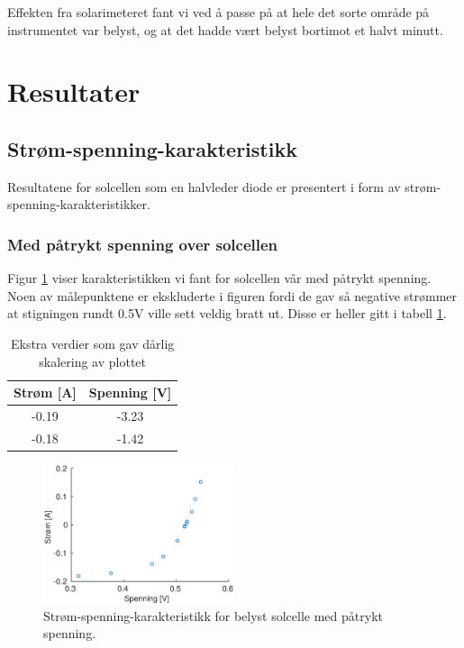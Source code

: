 \documentclass[a4paper,11pt, twocolumn]{article}
\begin{document}
Effekten fra solarimeteret fant vi ved å passe på at hele det sorte område på instrumentet var belyst, og at det hadde vært belyst bortimot et halvt minutt.

\section{Resultater}
\subsection{Strøm-spenning-karakteristikk}
Resultatene for solcellen som en halvleder diode er presentert i form av strøm-spenning-karakteristikker.
\subsubsection{Med påtrykt spenning over solcellen}
Figur \ref{fig:resMedSpenning} viser karakteristikken vi fant for solcellen vår med påtrykt spenning. Noen av målepunktene er ekskluderte i figuren fordi de gav så negative strømmer at stigningen rundt 0.5V ville sett veldig bratt ut. Disse er heller gitt i tabell \ref{tab:ekstra}.

\begin{table}[!ht]
\centering
	\caption{Ekstra verdier som gav dårlig skalering av plottet}
	\label{tab:ekstra}
	\begin{tabular}{cc}
		\toprule
		\toprule
		Strøm [A] & Spenning [V]\\
		\hline
		-0.19 & -3.23\\
		-0.18 & -1.42\\
		\toprule
	\end{tabular}
\end{table}

\begin{figure}[!ht]
	\includegraphics[width = 0.5\textwidth]{matlab/LAB/belystMedSpenning.eps}
	\caption{Strøm-spenning-karakteristikk for belyst solcelle med påtrykt spenning.}
	\label{fig:resMedSpenning}
\end{figure}
\end{document}
